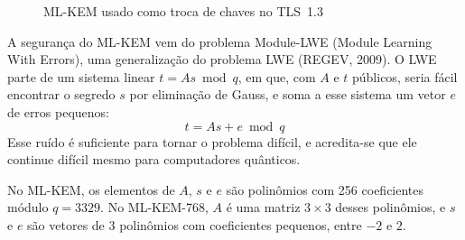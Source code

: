 \documentclass[12pt,a4paper]{article}
\newcommand{\fonte}[1]{\par\vspace{4pt}{\small Fonte: #1}}
\begin{document}
\begin{figure}[H]
\centering
\caption{ML-KEM usado como troca de chaves no TLS~1.3}
\label{fig:kem}
\fonte{Elaborado pelos autores com base em NIST (2024) e Kwiatkowski et al. (2026).}
\end{figure}



A segurança do ML-KEM vem do problema Module-LWE (Module Learning With
Errors), uma generalização do problema LWE (REGEV, 2009). O LWE parte de um sistema
linear $t = As \bmod q$, em que, com $A$ e $t$ públicos, seria fácil
encontrar o segredo $s$ por eliminação de Gauss, e soma a esse sistema um
vetor $e$ de erros pequenos:
\begin{equation}
t = A s + e \bmod q
\end{equation}
Esse ruído é suficiente para tornar o problema difícil, e acredita-se que ele
continue difícil mesmo para computadores quânticos.

No ML-KEM, os elementos de $A$, $s$ e $e$ são polinômios com 256
coeficientes módulo $q = 3329$. No ML-KEM-768, $A$ é uma matriz
$3 \times 3$ desses polinômios, e $s$ e $e$ são vetores de 3 polinômios com
coeficientes pequenos, entre $-2$ e $2$.
\end{document}
